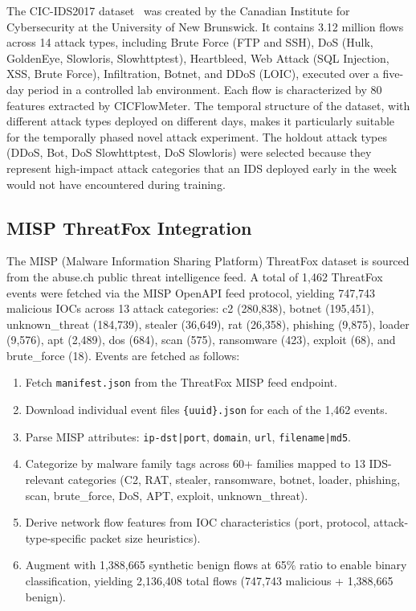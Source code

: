 \documentclass[12pt, letterpaper, oneside]{report}
\begin{document}
The CIC-IDS2017 dataset~\cite{sharafaldin2018} was created by the Canadian Institute for Cybersecurity at the University of New Brunswick. It contains 3.12 million flows across 14 attack types, including Brute Force (FTP and SSH), DoS (Hulk, GoldenEye, Slowloris, Slowhttptest), Heartbleed, Web Attack (SQL Injection, XSS, Brute Force), Infiltration, Botnet, and DDoS (LOIC), executed over a five-day period in a controlled lab environment. Each flow is characterized by 80 features extracted by CICFlowMeter. The temporal structure of the dataset, with different attack types deployed on different days, makes it particularly suitable for the temporally phased novel attack experiment. The holdout attack types (DDoS, Bot, DoS Slowhttptest, DoS Slowloris) were selected because they represent high-impact attack categories that an IDS deployed early in the week would not have encountered during training.

\subsection{MISP ThreatFox Integration}

The MISP (Malware Information Sharing Platform) ThreatFox dataset is sourced from the abuse.ch public threat intelligence feed. A total of 1,462 ThreatFox events were fetched via the MISP OpenAPI feed protocol, yielding 747,743 malicious IOCs across 13 attack categories: c2 (280,838), botnet (195,451), unknown\_threat (184,739), stealer (36,649), rat (26,358), phishing (9,875), loader (9,576), apt (2,489), dos (684), scan (575), ransomware (423), exploit (68), and brute\_force (18). Events are fetched as follows:

\begin{enumerate}
    \item Fetch \texttt{manifest.json} from the ThreatFox MISP feed endpoint.
    \item Download individual event files \texttt{\{uuid\}.json} for each of the 1,462 events.
    \item Parse MISP attributes: \texttt{ip-dst|port}, \texttt{domain}, \texttt{url}, \texttt{filename|md5}.
    \item Categorize by malware family tags across 60+ families mapped to 13 IDS-relevant categories (C2, RAT, stealer, ransomware, botnet, loader, phishing, scan, brute\_force, DoS, APT, exploit, unknown\_threat).
    \item Derive network flow features from IOC characteristics (port, protocol, attack-type-specific packet size heuristics).
    \item Augment with 1,388,665 synthetic benign flows at 65\% ratio to enable binary classification, yielding 2,136,408 total flows (747,743 malicious + 1,388,665 benign).
\end{enumerate}
\end{document}
